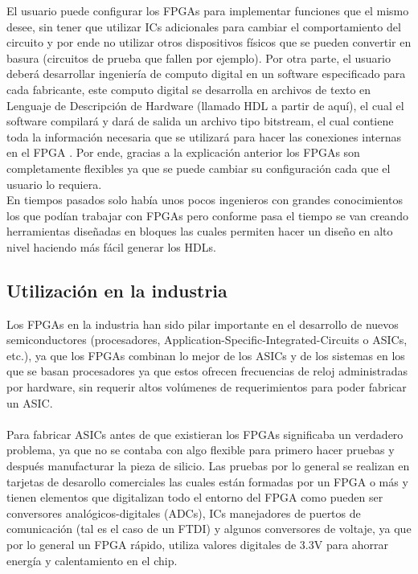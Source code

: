 \documentclass[twoside,spanish,ESP,MSc]{plantillaLabUPV}
\theoremstyle{definition}
\newcommand{\f}{FPGA }
\newcommand{\fs}{FPGAs }
\begin{document}
El usuario puede configurar los \fs   para implementar funciones que el mismo desee, sin tener que utilizar ICs adicionales para cambiar el comportamiento del circuito y por ende no utilizar otros dispositivos físicos que se pueden convertir en basura (circuitos de prueba que fallen por ejemplo). Por otra parte, el usuario deberá desarrollar ingeniería de computo digital en un software especificado para cada fabricante, este computo digital se desarrolla en archivos de texto en Lenguaje de Descripción de Hardware (llamado HDL a partir de aquí), el cual el software compilará y dará de salida un archivo tipo bitstream, el cual contiene toda la información necesaria que se utilizará para hacer las conexiones internas en el \f. Por ende, gracias a la explicación anterior los \fs son completamente flexibles ya que se puede cambiar su configuración cada que el usuario lo requiera. \\

En tiempos pasados solo había unos pocos ingenieros con grandes conocimientos los que podían trabajar con \fs pero conforme pasa el tiempo se van creando herramientas diseñadas en bloques las cuales permiten hacer un diseño en alto nivel haciendo más fácil generar los HDLs.

\subsection*{Utilización en la industria}

Los \fs en la industria han sido pilar importante en el desarrollo de nuevos semiconductores (procesadores, Application-Specific-Integrated-Circuits o ASICs, etc.), ya que los \fs combinan lo mejor de los ASICs y de los sistemas en los que se basan procesadores ya que estos ofrecen frecuencias de reloj administradas por hardware, sin requerir altos volúmenes de requerimientos para poder fabricar un ASIC. \\\\Para fabricar ASICs antes de que existieran los \fs significaba un verdadero problema, ya que no se contaba con algo flexible para primero hacer pruebas y después manufacturar la pieza de silicio. Las pruebas por lo general se realizan en tarjetas de desarollo comerciales %
las cuales están formadas por un \f o más y tienen elementos que digitalizan todo el entorno del \f como pueden ser conversores analógicos-digitales (ADCs), ICs manejadores de puertos de comunicación (tal es el caso de un FTDI) y algunos conversores de voltaje, ya que por lo general un \f rápido, utiliza valores digitales de 3.3V para ahorrar energía y calentamiento en el chip. \\
\end{document}
